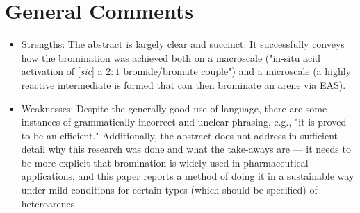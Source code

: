 \documentclass{article}
\begin{document}
\section*{General Comments}
\begin{itemize}
    \item Strengths: The abstract is largely clear and succinct. It successfully conveys how the bromination was achieved both on a macroscale ("in-situ acid activation of [\emph{sic}] a $2:1$ bromide/bromate couple") and a microscale (a highly reactive  intermediate is formed that can then brominate an arene via EAS).
    \item Weaknesses: Despite the generally good use of language, there are some instances of grammatically incorrect and unclear phrasing, e.g., "it is proved to be an efficient." Additionally, the abstract does not address in sufficient detail why this research was done and what the take-aways are --- it needs to be more explicit that bromination is widely used in pharmaceutical applications, and this paper reports a method of doing it in a sustainable way under mild conditions for certain types (which should be specified) of heteroarenes.
\end{itemize}
\end{document}
